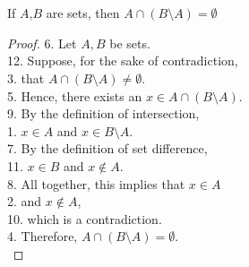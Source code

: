 \documentclass[12pt]{article}
\newenvironment{theorem}[2][Theorem]{\begin{trivlist}
\item[\hskip \labelsep {\bfseries #1}\hskip \labelsep {\bfseries #2.}]}{\end{trivlist}}
\begin{document}
\section{}
\begin{theorem}{10}
	If $A$,$B$ are sets, then $A \cap (B \setminus A) = \emptyset$
\end{theorem}
\begin{proof}

6. Let $A, B$ be sets.\\
12. Suppose, for the sake of contradiction, \\
3. that $A \cap (B \setminus A) \neq \emptyset$.\\
5. Hence, there exists an $x \in A \cap (B \setminus A)$.\\
9. By the definition of intersection,\\
1. $x \in A$ and $x \in B \setminus A$.\\
7. By the definition of set difference, \\
11. $x \in B$ and $x \notin A$.\\
8. All together, this implies that $x \in A$ \\
2. and $x \notin A$, \\
10. which is a contradiction.\\
4. Therefore, $A \cap (B \setminus A) = \emptyset$.\\

\end{proof}


 
\end{document}
